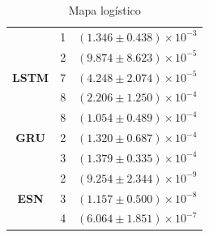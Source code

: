 \documentclass[a4paper, 12pt]{article}
\begin{document}
\begin{table}[!ht]
\begin{center}
\begin{subtable}{0.35\textwidth}
\begin{center}
{\begin{tabular}{c c c}
 \addlinespace
 & 1 & $(1.346 \pm 0.438) \times 10^{-3}$\\
 \addlinespace
 \hline
 \addlinespace
 & 2 & $(9.874 \pm 8.623) \times 10^{-5}$\\
 \addlinespace
 {\centering \textbf{LSTM}} & 7 & $(4.248 \pm 2.074) \times 10^{-5}$ \\ 
 \addlinespace
 & 8 & $(2.206 \pm 1.250) \times 10^{-4}$\\
 \addlinespace
 \hline
 \addlinespace
 & 8 & $(1.054 \pm 0.489) \times 10^{-4}$\\
 \addlinespace
 {\centering \textbf{GRU}} & 2 & $(1.320 \pm 0.687) \times 10^{-4}$\\ 
 \addlinespace
 & 3 & $(1.379 \pm 0.335) \times 10^{-4}$\\
 \addlinespace
 \hline
 \addlinespace
 & 2 & $(9.254 \pm 2.344) \times 10^{-9}$\\ 
 \addlinespace
 {\centering \textbf{ESN}} & 3 & $(1.157 \pm 0.500) \times 10^{-8}$\\ 
 \addlinespace 
 & 4 & $(6.064 \pm 1.851) \times 10^{-7}$\\ 
 \bottomrule
\end{tabular}}
\caption{Mapa logístico}
\label{tab:logistic-eqm-3best}
\end{center}
\end{subtable}
\begin{subtable}{0.35\textwidth}
\begin{center}
\end{center}
\end{subtable}
\end{center}
\end{table}
\end{document}
